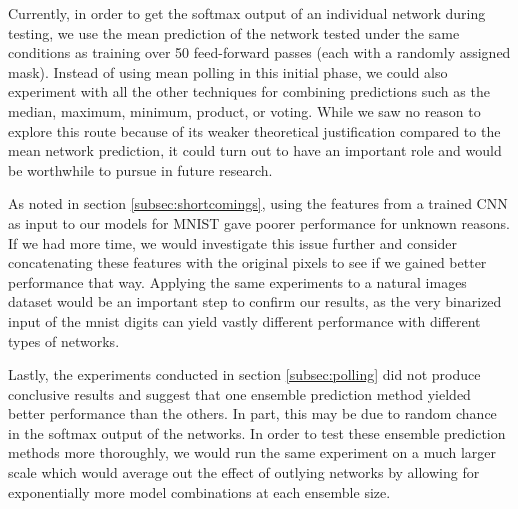 \documentclass{article} %
\begin{document}
Currently, in order to get the softmax output of an individual network during testing, we use the mean prediction of the network tested under the same conditions as training over 50 feed-forward passes (each with a randomly assigned mask). Instead of using mean polling in this initial phase, we could also experiment with all the other techniques for combining predictions such as the median, maximum, minimum, product, or voting. While we saw no reason to explore this route because of its weaker theoretical justification compared to the mean network prediction, it could turn out to have an important role and would be worthwhile to pursue in future research.

As noted in section \ref{subsec:shortcomings}, using the features from a trained CNN as input to our models for MNIST gave poorer performance for unknown reasons. If we had more time, we would investigate this issue further and consider concatenating these features with the original pixels to see if we gained better performance that way. Applying the same experiments to a natural images dataset would be an important step to confirm our results, as the very binarized input of the mnist digits can yield vastly different performance with different types of networks. 

Lastly, the experiments conducted in section \ref{subsec:polling} did not produce conclusive results and suggest that one ensemble prediction method yielded better performance than the others. In part, this may be due to random chance in the softmax output of the networks. In order to test these ensemble prediction methods more thoroughly, we would run the same experiment on a much larger scale which would average out the effect of outlying networks by allowing for exponentially more model combinations at each ensemble size.



\end{document}
